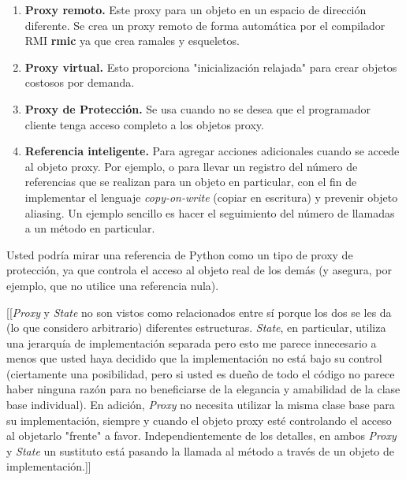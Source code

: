 \begin{enumerate}[1.]

    \item \textbf{Proxy remoto.} Este proxy para un objeto en un espacio de dirección diferente. Se crea un proxy remoto de forma automática por el compilador RMI \textbf{rmic} ya que crea ramales y esqueletos.
    
    \item \textbf{Proxy virtual.} Esto proporciona "inicialización relajada" para crear objetos costosos por demanda.
    
    \item \textbf{Proxy de Protección.} Se usa cuando no se desea que el programador cliente tenga acceso completo a los objetos proxy.
    
    \item \textbf{Referencia inteligente.} Para agregar acciones adicionales cuando se accede al objeto proxy. Por ejemplo, o para llevar un registro del número de referencias que se realizan para un objeto en particular, con el fin de implementar el lenguaje \textit{copy-on-write} (copiar en escritura) y prevenir objeto aliasing.
    Un ejemplo sencillo es hacer el seguimiento del número de llamadas a un método en particular.
\end{enumerate}

Usted podría mirar una referencia de Python como un tipo de proxy de protección, ya que controla el acceso al objeto real de los demás (y asegura, por ejemplo, que no utilice una referencia nula). \newline

[[\textit{Proxy} y \textit{State} no son vistos como relacionados entre sí porque los dos se les da (lo que considero arbitrario) diferentes estructuras.
\textit{State}, en particular, utiliza una jerarquía de implementación separada pero esto me parece innecesario a menos que usted haya decidido que la implementación no está bajo su control (ciertamente una posibilidad, pero si usted es dueño de todo el código no parece haber ninguna razón para no beneficiarse de la elegancia y amabilidad de la clase base individual). En adición, \textit{Proxy} no necesita utilizar la misma clase base para su implementación, siempre y cuando el objeto proxy esté controlando el acceso al objetarlo "frente" a favor. %
Independientemente de los detalles, en ambos \textit{Proxy} y \textit{State} un sustituto está pasando la llamada al método a través de un objeto de implementación.]]

